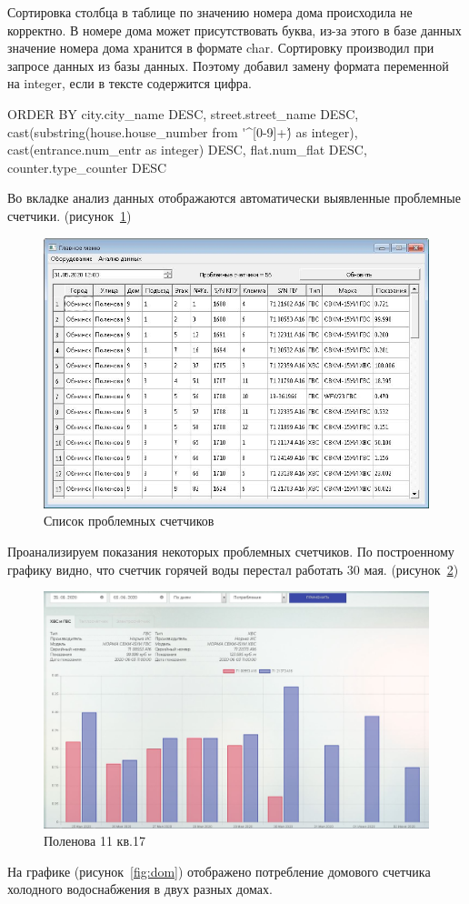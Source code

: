 Сортировка столбца в таблице по значению номера дома происходила не корректно. В номере дома может присутствовать буква, из-за этого в базе данных значение номера дома хранится в формате char. Сортировку производил при запросе данных из базы данных. Поэтому добавил замену формата переменной на integer, если в тексте содержится цифра.
\begin{MyCode}
ORDER BY city.city_name DESC, street.street_name DESC,
cast(substring(house.house_number from \'^[0-9]+\') as integer),
cast(entrance.num_entr as integer) DESC, 
flat.num_flat DESC, counter.type_counter DESC
\end{MyCode}
Во вкладке анализ данных отображаются автоматически выявленные проблемные счетчики. (рисунок~\ref{fig:3})
\begin{figure}[H]
	\centering
	\includegraphics[width=0.7\linewidth]{pics/3}
	\caption{Список проблемных счетчиков}
	\label{fig:3}
\end{figure}
Проанализируем показания некоторых проблемных счетчиков.
По построенному графику видно, что счетчик горячей воды перестал работать 30 мая. (рисунок~\ref{fig:11})
\begin{figure}[H]
	\centering
	\includegraphics[width=0.7\linewidth]{pics/11}
	\caption{Поленова 11 кв.17}
	\label{fig:11}
\end{figure}
На графике (рисунок~\ref{fig:dom}) отображено потребление домового счетчика холодного водоснабжения в двух разных домах.
